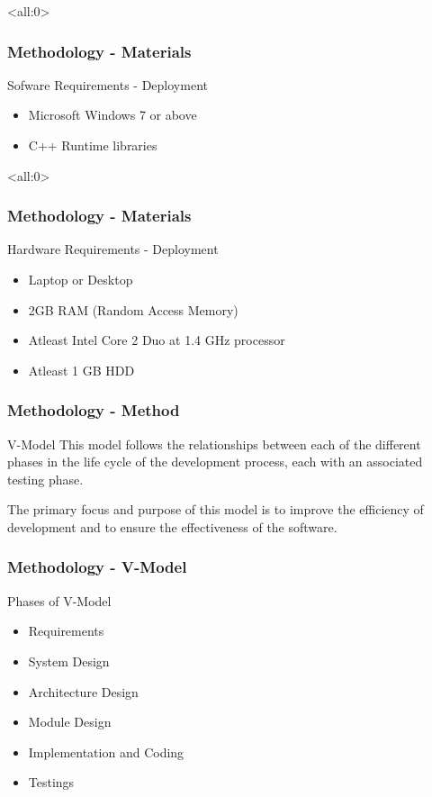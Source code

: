 \documentclass{beamer}
\begin{document}
\begin{frame}<all:0>
	\frametitle{Methodology - Materials}
	\begin{block}{Sofware Requirements - Deployment}
		\begin{itemize}
			\item<1-> Microsoft Windows 7 or above
			\item<2-> C++ Runtime libraries
		\end{itemize}
	\end{block}
\end{frame}

\begin{frame}<all:0>
	\frametitle{Methodology - Materials}
	\begin{block}{Hardware Requirements - Deployment}
		\begin{itemize}
			\item<1-> Laptop or Desktop
			\item<2-> 2GB RAM (Random Access Memory)
			\item<3-> Atleast Intel Core 2 Duo at 1.4 GHz processor
			\item<4-> Atleast 1 GB HDD
		\end{itemize}
	\end{block}
\end{frame}

\begin{frame}
	\frametitle{Methodology - Method}

	\begin{block}{V-Model}
		This model follows the relationships between each of the different phases
		in the life cycle of the development process, each with an associated
		testing phase.

		The primary focus and purpose of this model is to improve the efficiency of
		development and to ensure the effectiveness of the software.
	\end{block}
\end{frame}

\begin{frame}
	\frametitle{Methodology - V-Model}
	\begin{block}{Phases of V-Model}
		\begin{itemize}
			\item<1-> Requirements
			\item<2-> System Design
			\item<3-> Architecture Design
			\item<4-> Module Design
			\item<5-> Implementation and Coding
			\item<6-> Testings
		\end{itemize}
	\end{block}
\end{frame}
\end{document}
